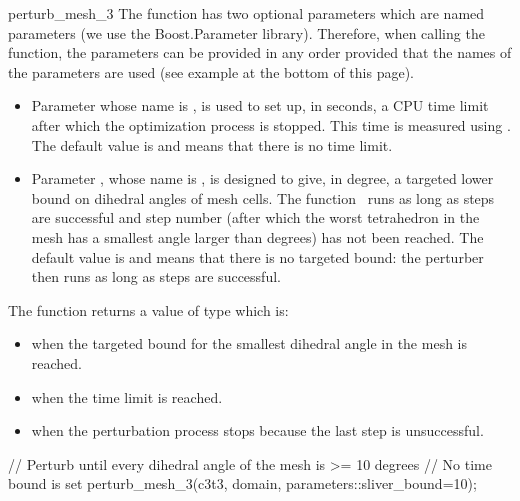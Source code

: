 \begin{ccRefFunction}{perturb_mesh_3}
The function has two optional parameters which are named parameters (we use the Boost.Parameter library). 
Therefore, when calling the function,  the parameters can be provided in any order 
provided that the names of the parameters are used
 (see example at the bottom of this page).
\begin{itemize}
\item
Parameter   whose name is ,
 is used to set up, in seconds,
 a CPU time limit after which the optimization process is stopped. This time is
 measured using .
The default value is  and means that there is no time limit.
\item 
Parameter , whose name is ,
is designed to give, in degree,  a targeted
lower bound on dihedral angles of mesh cells.
The function \ccRefName\  runs as long as steps are successful
 and  step number  (after which
the worst tetrahedron in the mesh has a smallest angle larger than 
  degrees) has not been reached.
The default value is  and means that  there is no targeted bound: 
the perturber  then runs as long as
steps are successful.
\end{itemize}




The function \ccRefName{} returns a value of type 
which is:
\begin{itemize}
\item {} when the targeted bound for the smallest dihedral angle in the mesh is reached.
\item{} when the time limit is reached.
\item {} when the perturbation process stops because the last step is unsuccessful.
\end{itemize}



\ccExample
\begin{ccExampleCode}
// Perturb until every dihedral angle of the mesh is >= 10 degrees
// No time bound is set
perturb_mesh_3(c3t3, domain, parameters::sliver_bound=10);
\end{ccExampleCode}

\ccSeeAlso

 \\
 \\
 \\
 \\
 \\

\end{ccRefFunction}

\ccRefPageEnd

